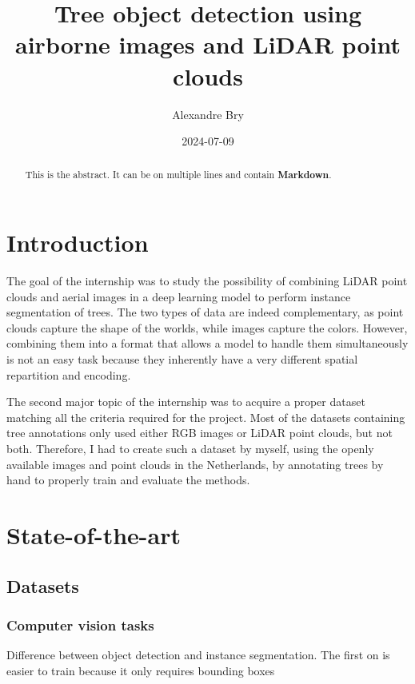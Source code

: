 \documentclass[
]{report}
\title{Tree object detection using airborne images and LiDAR point
clouds}
\author{Alexandre Bry}
\date{2024-07-09}
\renewcommand*\contentsname{Table of contents}
\newcommand\contentsname{Table of contents}
\begin{document}
\maketitle
\begin{abstract}
This is the abstract. It can be on multiple lines and contain
\textbf{Markdown}.
\end{abstract}

\renewcommand*\contentsname{Table of contents}
{
\hypersetup{linkcolor=}
\setcounter{tocdepth}{2}
\tableofcontents
}

\chapter{Introduction}\label{introduction}

The goal of the internship was to study the possibility of combining
LiDAR point clouds and aerial images in a deep learning model to perform
instance segmentation of trees. The two types of data are indeed
complementary, as point clouds capture the shape of the worlds, while
images capture the colors. However, combining them into a format that
allows a model to handle them simultaneously is not an easy task because
they inherently have a very different spatial repartition and encoding.

The second major topic of the internship was to acquire a proper dataset
matching all the criteria required for the project. Most of the datasets
containing tree annotations only used either RGB images or LiDAR point
clouds, but not both. Therefore, I had to create such a dataset by
myself, using the openly available images and point clouds in the
Netherlands, by annotating trees by hand to properly train and evaluate
the methods.

\chapter{State-of-the-art}\label{state-of-the-art}

\section{Datasets}\label{datasets}

\subsection{Computer vision tasks}\label{computer-vision-tasks}

Difference between object detection and instance segmentation. The first
on is easier to train because it only requires bounding boxes
\end{document}
